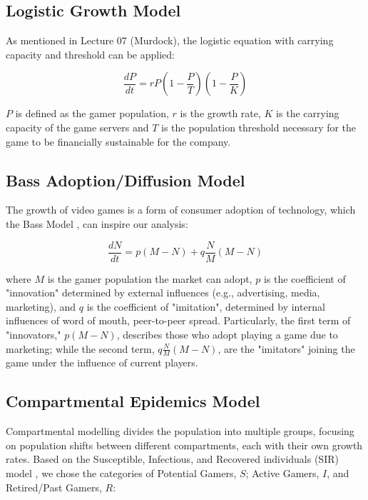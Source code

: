 \documentclass{article}
\begin{document}


\subsection{Logistic Growth Model}
As mentioned in Lecture 07 (Murdock), the logistic equation with carrying capacity and threshold can be applied: 

\begin{equation}
    \frac{dP}{dt} = rP \left(1 - \frac{P}{T}\right)\left(1 - \frac{P}{K}\right)
\end{equation}

\noindent $P$ is defined as the gamer population, $r$ is the growth rate, $K$ is the carrying capacity of the game servers and $T$ is the population threshold necessary for the game to be financially sustainable for the company.  

\subsection{Bass Adoption/Diffusion Model}
The growth of video games is a form of consumer adoption of technology, which the Bass Model \cite{916272ae-6b7a-3e62-b7e2-5747187dae7b, f1542a98-16de-3de1-ac28-c48c9779e63f}, can inspire our analysis: 

\begin{equation}
    \frac{dN}{dt} = p \left(M - N\right) + q \frac{N}{M} \left(M - N\right)
\end{equation}

\noindent where $M$ is the gamer population the market can adopt, $p$ is the coefficient of "innovation" determined by external influences (e.g., advertising, media, marketing), and $q$ is the coefficient of "imitation", determined by internal influences of word of mouth, peer-to-peer spread. Particularly, the first term of "innovators," $p \left(M - N\right)$, describes those who adopt playing a game due to marketing; while the second term, $ q \frac{N}{M} \left(M - N\right) $, are the "imitators" joining the game under the influence of current players. 


\subsection{Compartmental Epidemics Model}
Compartmental modelling divides the population into multiple groups, focusing on population shifts between different compartments, each with their own growth rates. Based on the Susceptible, Infectious, and Recovered individuals (SIR) model \cite{Hethcote2000Mathematics}, we chose the categories of Potential Gamers, $S$; Active Gamers, $I$, and Retired/Past Gamers, $R$:
\end{document}
